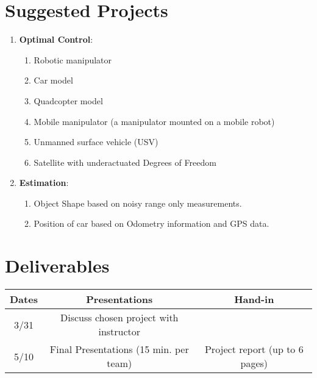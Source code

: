 \documentclass[11pt]{article}
\begin{document}
\section{Suggested Projects}
\begin{enumerate}
\item \textbf{Optimal Control}: 
\begin{enumerate}
  \item Robotic manipulator
  \item Car model
  \item Quadcopter model
  \item Mobile manipulator (a manipulator mounted on a mobile robot)
  \item Unmanned surface vehicle (USV) 
  \item Satellite with underactuated Degrees of Freedom
\end{enumerate}
\item \textbf{Estimation}:
\begin{enumerate}
  \item  Object Shape based on noisy range only measurements.
  \item Position of car based on Odometry information and GPS data.
\end{enumerate}
\end{enumerate}

\section{Deliverables}
% 

\centering
\begin{tabular}{|c|c|c|}\hline
  Dates & Presentations & Hand-in \\\hline\hline
3/31 & Discuss chosen project with instructor & \\ \hline
5/10 & Final Presentations (15 min. per team) & Project report (up to 6 pages)\\\hline
\end{tabular}


  
\end{document}
